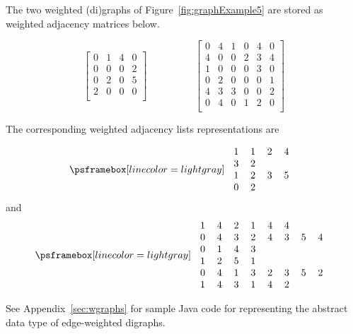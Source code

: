 \begin{Example}
The two weighted (di)graphs of Figure~\ref{fig:graphExample5} are
stored as weighted adjacency matrices below.

\[ 
\left[
\begin{array}{cccc}
0 & 1 & 4 & 0  \\
0 & 0 & 0 & 2  \\
0 & 2 & 0 & 5  \\
2 & 0 & 0 & 0  \\
\end{array}
\right]
\hspace{2cm}
\left[
\begin{array}{cccccc}
0 & 4 & 1 & 0 & 4 & 0 \\
4 & 0 & 0 & 2 & 3 & 4 \\
1 & 0 & 0 & 0 & 3 & 0 \\
0 & 2 & 0 & 0 & 0 & 1 \\
4 & 3 & 3 & 0 & 0 & 2 \\
0 & 4 & 0 & 1 & 2 & 0 \\
\end{array}
\right]
\]

The corresponding weighted adjacency lists representations are

$$
\AdjLists{
\begin{tabular}{llll}
1 & 1 & 2 & 4 \\
3 & 2 &   &   \\
1 & 2 & 3 & 5 \\
0 & 2 &   & \\
\end{tabular}
}
$$
 and \hspace{2cm}
$$
\AdjLists{
\begin{tabular}{llllllll}
1 & 4 & 2 & 1 & 4 & 4 & & \\
0 & 4 & 3 & 2 & 4 & 3 & 5 & 4 \\
0 & 1 & 4 & 3 & & & & \\
1 & 2 & 5 & 1 & & & & \\
0 & 4 & 1 & 3 & 2 & 3 & 5 & 2 \\
1 & 4 & 3 & 1 & 4 & 2 & & \\
\end{tabular}
}
$$
\end{Example}

See Appendix~\ref{sec:wgraphs} for sample Java code for representing
the abstract data type of edge-weighted digraphs.


